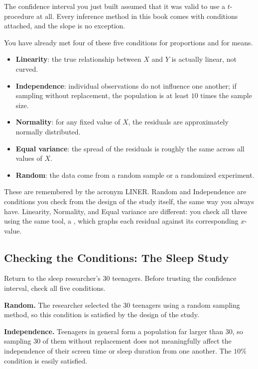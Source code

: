 The confidence interval you just built assumed that it was valid to use a $t$-procedure at all. Every inference method in this book comes with conditions attached, and the slope is no exception. 

You have already met four of these five conditions for proportions and for means.

\begin{itemize}
    
    \item \textbf{Linearity}: the true relationship between $X$ and $Y$ is actually linear, not curved.
    \item \textbf{Independence}: individual observations do not influence one another; if sampling without replacement, the population is at least $10$ times the sample size.
    \item \textbf{Normality}: for any fixed value of $X$, the residuals are approximately normally distributed.
    \item \textbf{Equal variance}: the spread of the residuals is roughly the same across all values of $X$.
    \item \textbf{Random}: the data come from a random sample or a randomized experiment.
\end{itemize}

These are remembered by the acronym LINER. Random and Independence are conditions you check from the design of the study itself, the same way you always have. Linearity, Normality, and Equal variance are different: you check all three using the same tool, a , which graphs each residual against its corresponding $x$-value.


\subsection*{Checking the Conditions: The Sleep Study}

Return to the sleep researcher's $30$ teenagers. Before trusting the confidence interval, check all five conditions.

\textbf{Random.} The researcher selected the $30$ teenagers using a random sampling method, so this condition is satisfied by the design of the study.

\textbf{Independence.} Teenagers in general form a population far larger than $30$, so sampling $30$ of them without replacement does not meaningfully affect the independence of their screen time or sleep duration from one another. The $10\%$ condition is easily satisfied.

